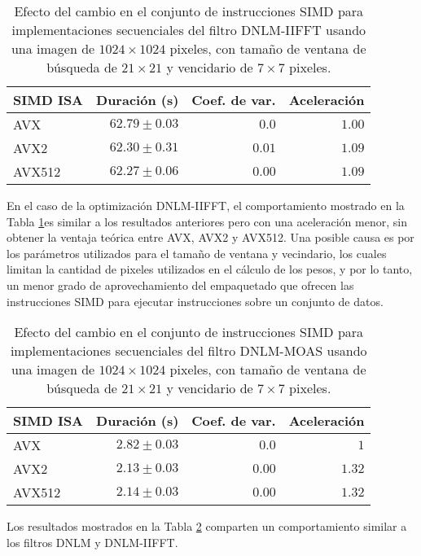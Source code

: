 \begin{table}
\protect\caption{Efecto del cambio en el conjunto de instrucciones SIMD para implementaciones secuenciales del filtro DNLM-IIFFT usando una imagen de  $1024 \times 1024$ pixeles, con tama\~no de ventana de b\'usqueda de $21 \times 21$ y vencidario de $7 \times 7$ pixeles. \label{tabla:vec_dnlm_iifft}}
\centering
\begin{tabular}{lrrr}
SIMD ISA & Duraci\'on (s)& Coef. de var. & Aceleraci\'on \tabularnewline
\hline
AVX & $62.79\pm0.03$ & $0.0$ & $1.00$\tabularnewline
AVX2 & $62.30\pm0.31$ & $0.01$ & $1.09$\tabularnewline
AVX512 & $62.27\pm 0.06$ & $0.00$ & $1.09$ \tabularnewline
\end{tabular}
\end{table}


En el caso de la optimizaci\'on DNLM-IIFFT, el comportamiento mostrado en la Tabla \ref{tabla:vec_dnlm_iifft}es similar a los resultados anteriores pero con una aceleraci\'on menor, sin obtener la ventaja te\'orica entre AVX, AVX2 y AVX512. Una posible causa es por los par\'ametros utilizados para el tama\~no de ventana y vecindario, los cuales limitan la cantidad de pixeles utilizados en el c\'alculo de los pesos, y por lo tanto, un menor grado de aprovechamiento del empaquetado que ofrecen las instrucciones SIMD para ejecutar instrucciones sobre un conjunto de datos.

\begin{table}
\protect\caption{Efecto del cambio en el conjunto de instrucciones SIMD para implementaciones secuenciales del filtro DNLM-MOAS usando una imagen de  $1024 \times 1024$ pixeles, con tama\~no de ventana de b\'usqueda de $21 \times 21$ y vencidario de $7 \times 7$ pixeles. \label{tabla:vec_dnlm_moas}}
\centering
\begin{tabular}{lrrr}
SIMD ISA & Duraci\'on (s)& Coef. de var. & Aceleraci\'on \tabularnewline
\hline
AVX & $2.82\pm0.03$ & $0.0$ & $1$\tabularnewline
AVX2 & $2.13\pm0.03$ & $0.00$ & $1.32$\tabularnewline
AVX512 & $2.14\pm 0.03$ & $0.00$ & $1.32$ \tabularnewline
\end{tabular}
\end{table}



Los resultados mostrados en la Tabla \ref{tabla:vec_dnlm_moas} comparten un comportamiento similar a los filtros DNLM y DNLM-IIFFT. 




